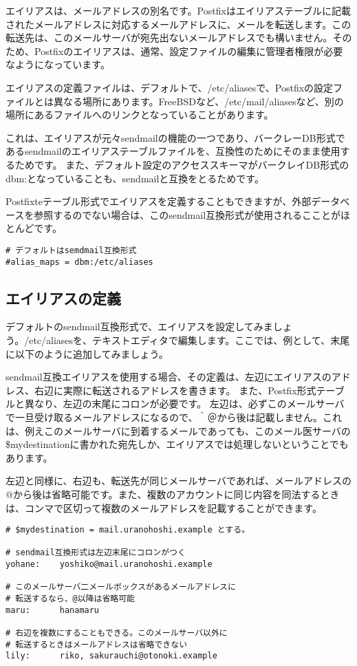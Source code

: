 エイリアスは、メールアドレスの別名です。Postfixはエイリアステーブルに記載されたメールアドレスに対応するメールアドレスに、メールを転送します。この転送先は、このメールサーバが宛先出ないメールアドレスでも構いません。そのため、Postfixのエイリアスは、通常、設定ファイルの編集に管理者権限が必要なようになっています。

エイリアスの定義ファイルは、デフォルトで、/etc/aliasesで、Postfixの設定ファイルとは異なる場所にあります。FreeBSDなど、/etc/mail/aliasesなど、別の場所にあるファイルへのリンクとなっていることがあります。

これは、エイリアスが元々sendmailの機能の一つであり、バークレーDB形式であるsendmailのエイリアステーブルファイルを、互換性のためにそのまま使用するためです。
また、デフォルト設定のアクセススキーマがバークレイDB形式のdbm:となっていることも、sendmailと互換をとるためです。

Postfixteテーブル形式でエイリアスを定義することもできますが、外部データベースを参照するのでない場合は、このsendmail互換形式が使用されるこことがほとんどです。

\begin{lstlisting}[basicstyle=\ttfamily\footnotesize, frame=single]
# デフォルトはsemdmail互換形式
#alias_maps = dbm:/etc/aliases
\end{lstlisting}

\subsection{エイリアスの定義}
デフォルトのsendmail互換形式で、エイリアスを設定してみましょう。/etc/aliasesを、テキストエディタで編集します。ここでは、例として、末尾に以下のように追加してみましょう。

sendmail互換エイリアスを使用する場合、その定義は、左辺にエイリアスのアドレス、右辺に実際に転送されるアドレスを書きます。
また、Postfix形式テーブルと異なり、左辺の末尾にコロンが必要です。
左辺は、必ずこのメールサーバで一旦受け取るメールアドレスになるので、｀＠から後は記載しません。これは、例えこのメールサーバに到着するメールであっても、このメール医サーバの\$mydestinationに書かれた宛先しか、エイリアスでは処理しないということでもあります。

左辺と同様に、右辺も、転送先が同じメールサーバであれば、メールアドレスの@から後は省略可能です。また、複数のアカウントに同じ内容を同法するときは、コンマで区切って複数のメールアドレスを記載することができます。

\begin{lstlisting}[basicstyle=\ttfamily\footnotesize, frame=single]
# $mydestination = mail.uranohoshi.example とする。

# sendmail互換形式は左辺末尾にコロンがつく
yohane:    yoshiko@mail.uranohoshi.example

# このメールサーバ二メールボックスがあるメールアドレスに
# 転送するなら、@以降は省略可能
maru:      hanamaru

# 右辺を複数にすることもできる。このメールサーバ以外に
# 転送するときはメールアドレスは省略できない
lily:      riko, sakurauchi@otonoki.example
\end{lstlisting}

